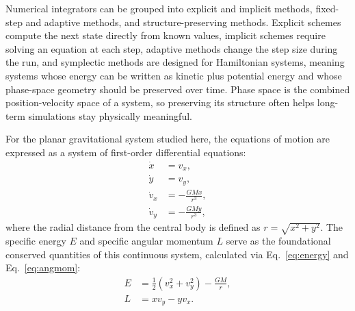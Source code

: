 \documentclass[12pt]{article}
\begin{document}
Numerical integrators can be grouped into explicit and implicit methods, fixed-step and adaptive methods, and structure-preserving methods. Explicit schemes compute the next state directly from known values, implicit schemes require solving an equation at each step, adaptive methods change the step size during the run, and symplectic methods are designed for Hamiltonian systems, meaning systems whose energy can be written as kinetic plus potential energy and whose phase-space geometry should be preserved over time. Phase space is the combined position-velocity space of a system, so preserving its structure often helps long-term simulations stay physically meaningful\supercite{hairer1993,press2007,butcher1996,hairer2006,leimkuhler2004}.

For the planar gravitational system studied here, the equations of motion are expressed as a system of first-order differential equations:
\begin{align}
	\dot{x} &= v_x, \label{eq:x_dot} \\
	\dot{y} &= v_y, \label{eq:y_dot} \\
	\dot{v}_x &= -\frac{GMx}{r^3}, \label{eq:vx_dot} \\
	\dot{v}_y &= -\frac{GMy}{r^3}, \label{eq:vy_dot}
\end{align}
where the radial distance from the central body is defined as $r = \sqrt{x^2+y^2}$. The specific energy $E$ and specific angular momentum $L$ serve as the foundational conserved quantities of this continuous system, calculated via Eq.~\eqref{eq:energy} and Eq.~\eqref{eq:angmom}:
\begin{align}
	E &= \frac{1}{2}\left(v_x^2+v_y^2\right) - \frac{GM}{r}, \label{eq:energy} \\
	L &= x v_y - y v_x. \label{eq:angmom}
\end{align}
\end{document}
